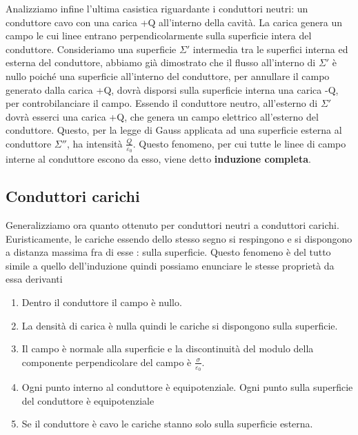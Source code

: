 \documentclass[10pt,a4paper]{article}
\begin{document}
Analizziamo infine l'ultima casistica riguardante i conduttori neutri: un conduttore cavo con una carica +Q all'interno della cavità. La carica genera un campo le cui linee entrano perpendicolarmente sulla superficie intera del conduttore. Consideriamo una superficie $\Sigma'$ intermedia tra le superfici interna ed esterna del conduttore, abbiamo già dimostrato che il flusso all'interno di $\Sigma'$ è nullo poiché una superficie all'interno del conduttore, per annullare il campo generato dalla carica +Q, dovrà disporsi sulla superficie interna una carica -Q, per controbilanciare il campo. Essendo il conduttore neutro, all'esterno di $\Sigma'$ dovrà esserci una carica +Q, che genera un campo elettrico all'esterno del conduttore. Questo, per la legge di Gauss applicata ad una superficie esterna al conduttore $\Sigma''$, ha intensità $\frac{Q}{\varepsilon_0}$. Questo fenomeno, per cui tutte le linee di campo interne al conduttore escono da esso, viene detto \textbf{induzione completa}.  
\subsection{Conduttori carichi}
Generalizziamo ora quanto ottenuto per conduttori neutri a conduttori carichi. Euristicamente, le cariche essendo dello stesso segno si respingono e si dispongono a distanza massima fra di esse : sulla superficie. Questo fenomeno è del tutto simile a quello dell'induzione quindi possiamo enunciare le stesse proprietà da essa derivanti
\begin{enumerate}
	\item Dentro il conduttore il campo è nullo.
	\item La densità di carica è nulla quindi le cariche si dispongono sulla superficie.
	\item Il campo è normale alla superficie e la discontinuità del modulo della componente perpendicolare del campo è $\frac{\sigma}{\varepsilon_0}$.
	\item Ogni punto interno al conduttore è equipotenziale. Ogni punto sulla superficie del conduttore è equipotenziale 
	\item Se il conduttore è cavo le cariche stanno solo sulla superficie esterna.
\end{enumerate}
\end{document}
